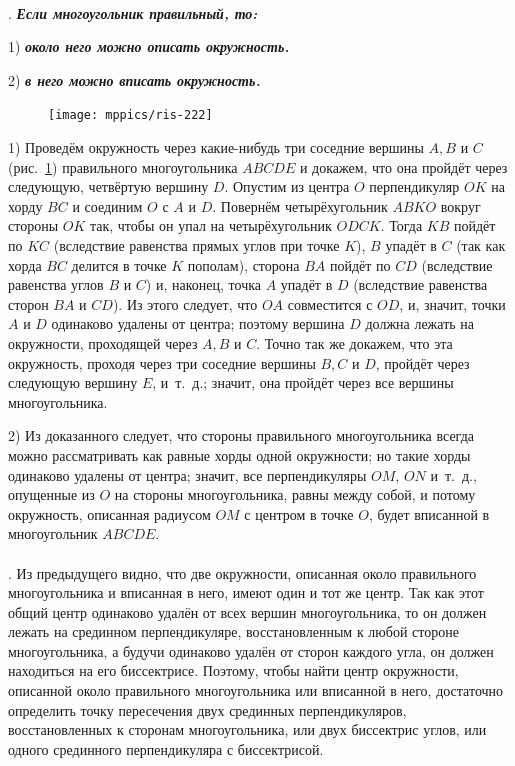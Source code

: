 \documentclass[oneside]{book}
\begin{document}
\paragraph{}\label{1938/215}
.
\textbf{\emph{Если многоугольник правильный, то:}}

1) \textbf{\emph{около него можно описать окружность.}}

2) \textbf{\emph{в него можно вписать окружность.}}

\begin{figure}
\centering
\texttt{[image: mppics/ris-222]}
\caption{}\label{1938/ris-222}
\end{figure}

1) Проведём окружность через какие-нибудь три соседние вершины $A, B$ и $C$ (рис.~\ref{1938/ris-222}) правильного многоугольника $ABCDE$ и докажем, что она пройдёт через следующую, четвёртую вершину $D$.
Опустим из центра $O$ перпендикуляр $OK$ на хорду $BC$ и соединим $O$ с $A$ и $D$.
Повернём четырёхугольник $ABKO$ вокруг стороны $OK$ так, чтобы он упал на четырёхугольник $ODCK$.
Тогда $KB$ пойдёт по $KC$ (вследствие равенства прямых углов при точке $K$), 
$B$ упадёт в $C$ (так как хорда $BC$ делится в точке $K$ пополам), 
сторона $BA$ пойдёт по $CD$ (вследствие равенства углов $B$ и $C$)
и, наконец, точка $A$ упадёт в $D$ (вследствие равенства сторон $BA$ и $CD$).
Из этого следует, что $OA$ совместится с $OD$, и, значит, точки $A$ и $D$ одинаково удалены от центра;
поэтому вершина $D$ должна лежать на окружности, проходящей через $A, B$ и $C$.
Точно так же докажем, что эта окружность, проходя через три соседние вершины $B, C$ и $D$, пройдёт через следующую вершину $E$, и~т.~д.;
значит, она пройдёт через все вершины многоугольника.

2) Из доказанного следует, что стороны правильного многоугольника всегда можно рассматривать как равные хорды одной окружности;
но такие хорды одинаково удалены от центра;
значит, все перпендикуляры $OM$, $ON$ и~т.~д., опущенные из $O$ на стороны многоугольника, равны между собой, и потому окружность, описанная радиусом $OM$ с центром в точке $O$, будет вписанной в многоугольник $ABCDE$.

\paragraph{}\label{1938/216}
.
Из предыдущего видно, что две окружности, описанная около правильного многоугольника и вписанная в него, имеют один и тот же центр.
Так как этот общий центр одинаково удалён от всех вершин многоугольника, то он должен лежать на срединном перпендикуляре, восстановленным к любой стороне многоугольника, а будучи одинаково удалён от сторон каждого угла, он должен находиться на его биссектрисе.
Поэтому, чтобы найти центр окружности, описанной около правильного многоугольника или вписанной в него, достаточно определить точку пересечения двух срединных перпендикуляров, восстановленных к сторонам многоугольника, или двух биссектрис углов, или одного срединного перпендикуляра с биссектрисой.
\end{document}
